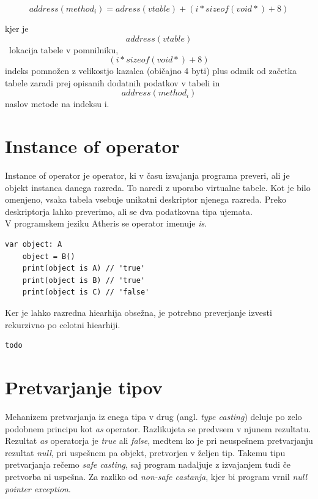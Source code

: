 \documentclass[a4paper, 12p]{book}
\begin{document}
\[ address(method_i) = adress(vtable) + (i * sizeof(void*) + 8) \]

kjer je \[address(vtable)\]\ lokacija tabele v pomnilniku, \[(i * sizeof(void*) + 8)\] indeks pomnožen z velikostjo kazalca (običajno 4 byti) plus odmik od začetka tabele zaradi prej opisanih dodatnih podatkov v tabeli in \[ address(method_i)\] naslov metode na indeksu i.

\section{Instance of operator}

Instance of operator je operator, ki v času izvajanja programa preveri, ali je objekt instanca danega razreda. To naredi z uporabo virtualne tabele. Kot je bilo omenjeno, vsaka tabela vsebuje unikatni deskriptor njenega razreda. Preko deskriptorja lahko preverimo, ali se dva podatkovna tipa ujemata. \\
\indent V programskem jeziku Atheris se operator imenuje \textit{is}.

\begin{lstlisting}[caption={Uporaba operatorja \textit{is} za razrede iz sheme ~\ref{vtables}.}, captionpos=b]
	var object: A
	object = B()
	print(object is A) // 'true'
	print(object is B) // 'true'
	print(object is C) // 'false'
\end{lstlisting}

Ker je lahko razredna hiearhija obsežna, je potrebno preverjanje izvesti rekurzivno po celotni hiearhiji.

\begin{lstlisting}[caption={Algoritem za izračun ali je objekt instanca danega razeda.}, captionpos=b]
todo
\end{lstlisting}

\section{Pretvarjanje tipov}

Mehanizem pretvarjanja iz enega tipa v drug (angl. \textit{type casting}) deluje po zelo podobnem principu kot \textit{as} operator. Razlikujeta se predvsem v njunem rezultatu. Rezultat \textit{as} operatorja je \textit{true} ali \textit{false}, medtem ko je pri neuspešnem pretvarjanju rezultat \textit{null}, pri uspešnem pa objekt, pretvorjen v željen tip. Takemu tipu pretvarjanja rečemo \textit{safe casting}, saj program nadaljuje z izvajanjem tudi če pretvorba ni uspešna. Za razliko od \textit{non-safe castanja}, kjer bi program vrnil \textit{null pointer exception}.
\end{document}
